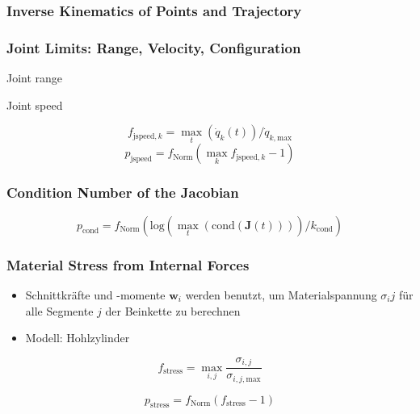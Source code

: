 \documentclass[fleqn,a4paper,10pt]{article}
\newcommand{\bm}[1]{\mathbf{#1}}
\begin{document}
\begin{multicols}{2}
\subsubsection{Inverse Kinematics of Points and Trajectory}

\subsubsection{Joint Limits: Range, Velocity, Configuration}

Joint range



Joint speed

\begin{equation}
f_{\mathrm{jspeed},k} = \max\limits_{t}(\dot{q}_k(t)) / \dot{q}_{k,\mathrm{max}}
\end{equation}
\begin{equation}
p_{\mathrm{jspeed}} = f_\mathrm{Norm}(\max\limits_{k} f_{\mathrm{jspeed},k}-1)
\end{equation}
\subsubsection{Condition Number of the Jacobian}

\begin{equation}
p_{\mathrm{cond}} = f_\mathrm{Norm}(\mathrm{log}(\max\limits_{t}( \mathrm{cond}(\bm{J}(t))))/k_{\mathrm{cond}})
\end{equation}

\subsubsection{Material Stress from Internal Forces}

\begin{itemize}
\item Schnittkräfte und -momente $\bm{w}_{i}$ werden benutzt, um Materialspannung $\sigma_ij$ für alle Segmente $j$ der Beinkette zu berechnen
\item Modell: Hohlzylinder
\end{itemize}

\begin{equation}
f_\mathrm{stress} = \max\limits_{i,j} \frac{\sigma_{i,j}}{\sigma_{i,j,\mathrm{max}}} %
\end{equation}

\begin{equation}
p_{\mathrm{stress}} = f_\mathrm{Norm}(f_\mathrm{stress}-1)
\end{equation}


\end{multicols}
\end{document}
